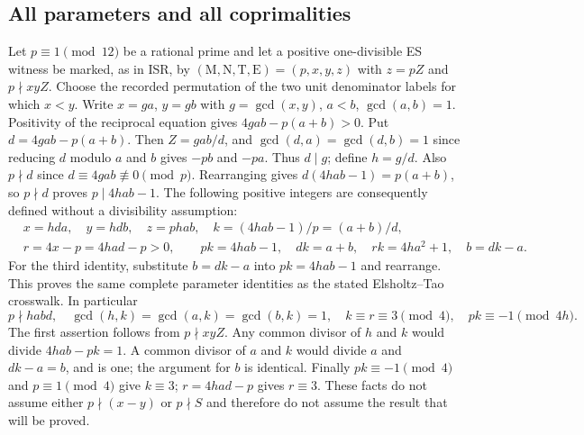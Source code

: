 \documentclass[11pt]{article}
\begin{document}
\subsection{All parameters and all coprimalities}
Let $p\equiv1\pmod{12}$ be a rational prime and let a positive
one-divisible ES witness be marked, as in ISR, by
$(\mathrm M,\mathrm N,\mathrm T,\mathrm E)=(p,x,y,z)$ with $z=pZ$
and $p\nmid xyZ$. Choose the recorded permutation of the two unit
denominator labels for which $x<y$. Write $x=g a$, $y=g b$ with
$g=\gcd(x,y)$, $a<b$, $\gcd(a,b)=1$. Positivity of the reciprocal
equation gives $4gab-p(a+b)>0$. Put $d=4gab-p(a+b)$. Then
$Z=gab/d$, and $\gcd(d,a)=\gcd(d,b)=1$ since reducing $d$ modulo
$a$ and $b$ gives $-pb$ and $-pa$. Thus $d\mid g$; define $h=g/d$.
Also $p\nmid d$ since $d\equiv4gab\not\equiv0\pmod p$.
Rearranging gives $d(4hab-1)=p(a+b)$, so $p\nmid d$ proves
$p\mid4hab-1$. The following positive integers are consequently
defined without a divisibility assumption:
\begin{equation}
 \begin{aligned}
 &x=hda,\quad y=hdb,\quad z=phab,\quad
 k=(4hab-1)/p=(a+b)/d,\\
 &r=4x-p=4had-p>0,\qquad
 pk=4hab-1,\quad dk=a+b,\quad rk=4ha^2+1,\quad b=dk-a.
 \end{aligned}                                          \tag{OE1}
\end{equation}
For the third identity, substitute $b=dk-a$ into $pk=4hab-1$
and rearrange. This proves the same complete parameter identities
as the stated Elsholtz--Tao crosswalk. In particular
\begin{equation}
 p\nmid habd,\quad \gcd(h,k)=\gcd(a,k)=\gcd(b,k)=1,
 \quad k\equiv r\equiv3\pmod4,
 \quad pk\equiv-1\pmod{4h}.                            \tag{OE2}
\end{equation}
The first assertion follows from $p\nmid xyZ$.
Any common divisor of $h$ and $k$ would divide $4hab-pk=1$.
A common divisor of $a$ and $k$ would divide $a$ and $dk-a=b$,
and is one; the argument for $b$ is identical. Finally
$pk\equiv-1\pmod4$ and $p\equiv1\pmod4$ give $k\equiv3$;
$r=4had-p$ gives $r\equiv3$. These facts do not assume either
$p\nmid(x-y)$ or $p\nmid S$ and therefore do not assume the result
that will be proved.
\end{document}
